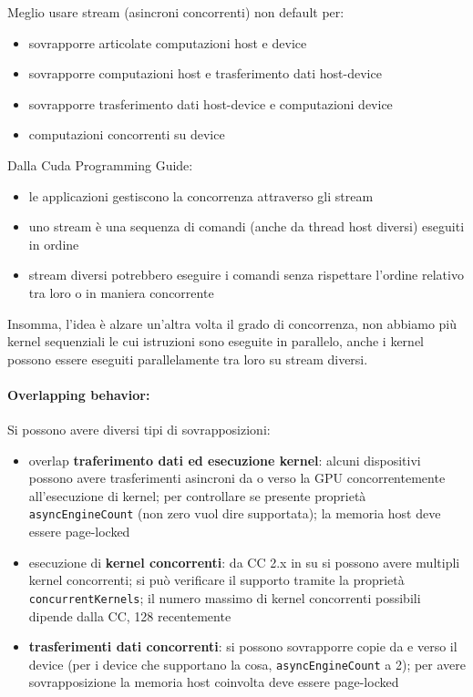 Meglio usare stream (asincroni concorrenti) non default per:
\begin{itemize}
	\item sovrapporre articolate computazioni host e device
	\item sovrapporre computazioni host e trasferimento dati host-device
	\item sovrapporre trasferimento dati host-device e computazioni device
	\item computazioni concorrenti su device
\end{itemize}

Dalla Cuda Programming Guide:
\begin{itemize}
	\item le applicazioni gestiscono la concorrenza attraverso gli stream
	\item uno stream è una sequenza di comandi (anche da thread host diversi) eseguiti in ordine
	\item stream diversi potrebbero eseguire i comandi senza rispettare l'ordine relativo tra loro o in maniera concorrente
\end{itemize}

Insomma, l'idea è alzare un'altra volta il grado di concorrenza, non abbiamo più kernel sequenziali le cui istruzioni sono eseguite in parallelo, anche i kernel possono essere eseguiti parallelamente tra loro su stream diversi.\\

\paragraph{Overlapping behavior:} Si possono avere diversi tipi di sovrapposizioni: 
\begin{itemize}
	\item overlap \textbf{traferimento dati ed esecuzione kernel}: alcuni dispositivi possono avere trasferimenti asincroni da o verso la GPU concorrentemente all'esecuzione di kernel; per controllare se presente proprietà \texttt{asyncEngineCount} (non zero vuol dire supportata); la memoria host deve essere page-locked
	\item esecuzione di \textbf{kernel concorrenti}: da CC 2.x in su si possono avere multipli kernel concorrenti; si può verificare il supporto tramite la proprietà \texttt{concurrentKernels}; il numero massimo di kernel concorrenti possibili dipende dalla CC, 128 recentemente
	\item \textbf{trasferimenti dati concorrenti}: si possono sovrapporre copie da e verso il device (per i device che supportano la cosa, \texttt{asyncEngineCount} a 2); per avere sovrapposizione la memoria host coinvolta deve essere page-locked
\end{itemize}

